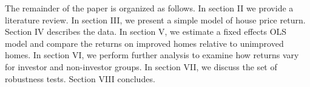 \documentclass{article}
\begin{document}
The remainder of the paper is organized as follows. In section II we provide a literature review. In section III, we present a simple model of house price return. Section IV describes the data. In section V, we estimate a fixed effects OLS model and compare the returns on improved homes relative to unimproved homes. In section VI, we perform further analysis to examine how returns vary for investor and non-investor groups. In section VII, we discuss the set of robustness tests. Section VIII concludes.

\end{document}
